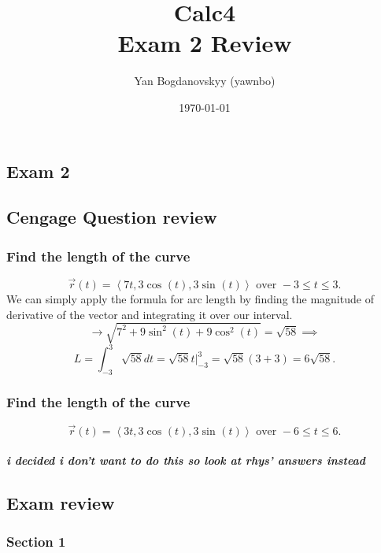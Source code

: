 \documentclass{report}
\title{\Huge{Calc4}\\ Exam 2 Review }
\author{\huge{Yan Bogdanovskyy (yawnbo)}}
\date{\today}
\begin{document}
\maketitle

\begin{multicols}{2}
\chapter{Exam 2}
\section{Cengage Question review}%
\label{sec: Cengage Question review }
\subsection{Find the length of the curve}%
\label{sub: Find the length of the curve }
\[
\vec{ r }\left( t \right) = \left< 7t, 3\cos^{  } \left( t \right) , 3\sin^{  } \left( t \right)  \right> \text{ over } -3 \le t \le 3
.\] 
We can simply apply the formula for arc length by finding the magnitude of derivative of the vector and integrating it over our interval. 
\[
	\to \sqrt{ 7^2 + 9\sin^{ 2 } \left( t \right) + 9\cos^{ 2 } \left( t \right)  }  = \sqrt{ 58 } \implies  
\] 
\[
L = \int_{ -3 }^{ 3 } \sqrt{ 58 } dt = \sqrt{ 58 } t \bigg|_{-3}^{ 3 } = \sqrt{ 58 }\left( 3+3 \right)  = 6\sqrt{ 58 }
.\] 

\subsection{Find the length of the curve}%
\label{sub: Find the length of the curve }
 \[
\vec{ r }\left( t \right) = \left< 3t,3\cos^{  } \left( t \right) , 3\sin^{  } \left( t \right)  \right>\text{ over } -6 \le t \le 6
.\] 
\paragraph{i decided i don't want to do this so look at rhys' answers instead}

\section{Exam review}%
\label{sec: Exam review }
\subsection{Section 1}%
\label{sub: Section 1 }

\end{multicols}
\end{document}
